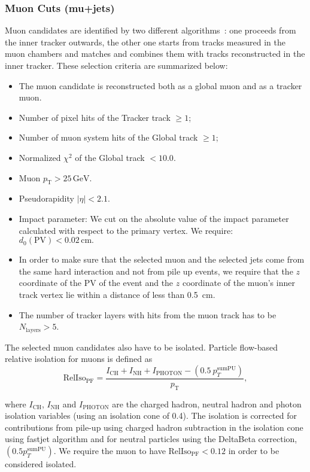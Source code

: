 \subsubsection{Muon Cuts (mu+jets)}
\label{sec:muon_cuts}

Muon candidates are identified by two different 
algorithms~\cite{MUONPAS}: one proceeds from the inner tracker outwards, 
the other one starts from tracks measured in the muon chambers and matches 
and combines them with tracks reconstructed in the inner tracker. 
These selection criteria are summarized below:
\begin{itemize}
\item The muon candidate is reconstructed both as a global muon and
as a tracker muon.
\item Number of pixel hits of the Tracker track $\ge 1$;
\item Number of muon system hits of the Global track $\ge 1$;
\item Normalized $\chi^{2}$ of the Global track $< 10.0$.
\item Muon $p_{\mathrm{T}} > 25\,\mathrm{GeV}$.
\item Pseudorapidity $|\eta| < 2.1$.
\item Impact parameter: We cut on the absolute value of the impact
parameter calculated with respect to the primary vertex. We require:
$d_0(\mathrm{PV}) < 0.02\,\mathrm{cm}.$
\item In order to make sure that the selected muon and the selected
jets come from the same hard interaction and not from pile up events,
we require that the $z$ coordinate of the PV of the event and the $z$
coordinate of the muon's inner track vertex lie within a distance of
less than 0.5~cm.
\item The number of tracker layers with hits from the muon track has to be
$N_{\mathrm{layers}} > 5$.
\end{itemize}

The selected muon candidates also have to be isolated. Particle
flow-based relative isolation for muons is defined as
\begin{equation*}
\mathrm{RelIso_{\mathrm{PF}}} = \frac{I_{\mathrm{CH}}+I_{\mathrm{NH}}+I_{\mathrm{PHOTON}}-(0.5~{p}_{T}^\mathrm{sumPU})}{p_\mathrm{T}},
\end{equation*} 

where $I_{\mathrm{CH}}$, $I_{\mathrm{NH}}$ and $I_{\mathrm{PHOTON}}$
are the charged hadron, neutral hadron and photon isolation variables
(using an isolation cone of 0.4). The isolation is corrected for
contributions from pile-up using charged hadron subtraction in the
isolation cone using fastjet algorithm \cite{FastJetPUSubtraction} and
for neutral particles using the DeltaBeta correction, $(0.5
p_T^\mathrm{sumPU})$. We require the muon to have
$\mathrm{RelIso_{\mathrm{PF}}} < 0.12$ in order to be considered
isolated.


